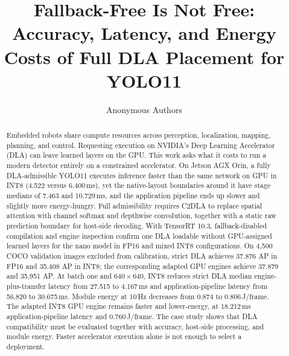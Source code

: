 \documentclass[letterpaper,10pt,conference]{ieeeconf}
\title{\LARGE\bf Fallback-Free Is Not Free: Accuracy, Latency, and Energy\\
Costs of Full DLA Placement for YOLO11}
\author{Anonymous Authors}
\begin{document}
\maketitle

\thispagestyle{empty}
\pagestyle{empty}

\begin{abstract}
Embedded robots share compute resources across perception, localization,
mapping, planning, and control. Requesting execution on NVIDIA's Deep Learning
Accelerator (DLA) can leave learned layers on the GPU. This work asks what it costs to run a modern detector entirely on a
constrained accelerator. On Jetson AGX Orin, a fully DLA-admissible YOLO11
executes inference faster than the same network on GPU in INT8 (4.522 versus
6.400\,ms), yet the native-layout boundaries around it have stage medians of
7.463 and 10.729\,ms, and the application pipeline ends up slower and slightly more
energy-hungry.
Full admissibility requires C2DLA to replace spatial attention with channel softmax and depthwise convolution, together with a static raw prediction boundary for host-side decoding. With TensorRT 10.3, fallback-disabled
compilation and engine inspection confirm one DLA loadable without GPU-assigned
learned layers for the nano model in FP16 and mixed INT8 configurations.
On 4,500 COCO validation images excluded from calibration,
strict DLA achieves 37.876 AP in FP16 and 35.408 AP in INT8; the corresponding
adapted GPU engines achieve 37.879 and 35.951 AP. At batch one and
$640\times640$, INT8 reduces strict DLA median engine-plus-transfer latency
from 27.515 to 4.167\,ms and application-pipeline latency from 56.820 to
30.675\,ms. Module energy at 10\,Hz decreases from 0.874 to 0.806\,J/frame.
The adapted INT8 GPU engine remains faster and lower-energy, at 18.212\,ms
application-pipeline latency and 0.760\,J/frame. The case study shows that
DLA compatibility must be evaluated together with accuracy, host-side processing,
and module energy. Faster accelerator execution alone is not enough to select
a deployment.
\end{abstract}












\end{document}
